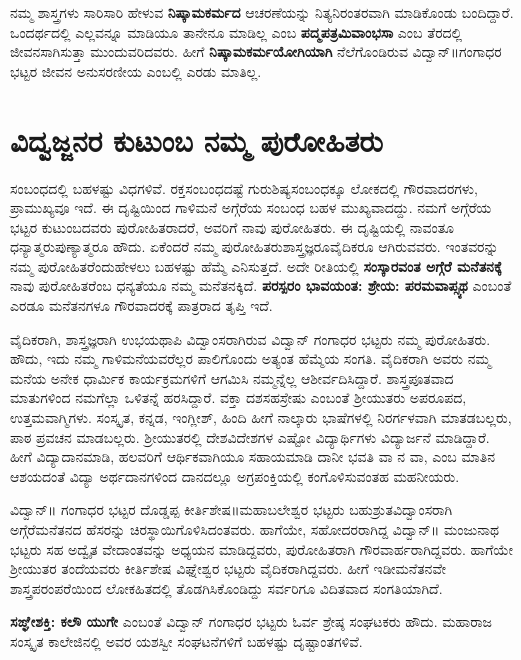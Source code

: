{ನಮ್ಮ ಶಾಸ್ತ್ರಗಳು ಸಾರಿ\enginline{-}ಸಾರಿ ಹೇಳುವ \textbf{ನಿಷ್ಕಾಮಕರ್ಮದ} ಆಚರಣೆಯನ್ನು ನಿತ್ಯ\enginline{-}ನಿರಂತರವಾಗಿ ಮಾಡಿಕೊಂಡು ಬಂದಿದ್ದಾರೆ. ಒಂದರ್ಥದಲ್ಲಿ ಎಲ್ಲವನ್ನೂ ಮಾಡಿಯೂ ತಾನೇನೂ ಮಾಡಿಲ್ಲ ಎಂಬ \textbf{ಪದ್ಮಪತ್ರಮಿವಾಂಭಸಾ} ಎಂಬ ತೆರದಲ್ಲಿ ಜೀವನಸಾಗಿಸುತ್ತಾ ಮುಂದುವರಿದವರು. ಹೀಗೆ \textbf{ನಿಷ್ಕಾಮಕರ್ಮಯೋಗಿಯಾಗಿ} ನೆಲೆಗೊಂಡಿರುವ ವಿದ್ವಾನ್॥ಗಂಗಾಧರ ಭಟ್ಟರ ಜೀವನ ಅನುಸರಣೀಯ ಎಂಬಲ್ಲಿ ಎರಡು ಮಾತಿಲ್ಲ.

\section*{ವಿದ್ವಜ್ಜನರ ಕುಟುಂಬ   \enginline{-}   ನಮ್ಮ ಪುರೋಹಿತರು}

ಸಂಬಂಧದಲ್ಲಿ ಬಹಳಷ್ಟು ವಿಧಗಳಿವೆ. ರಕ್ತಸಂಬಂಧದಷ್ಟೆ ಗುರು\enginline{-}ಶಿಷ್ಯಸಂಬಂಧಕ್ಕೂ ಲೋಕದಲ್ಲಿ ಗೌರವಾದರಗಳು, ಪ್ರಾಮುಖ್ಯವೂ ಇದೆ. ಈ ದೃಷ್ಟಿಯಿಂದ ಗಾಳಿಮನೆ  \enginline{-}  ಅಗ್ಗೆರೆಯ ಸಂಬಂಧ ಬಹಳ ಮುಖ್ಯವಾದದ್ದು.  ನಮಗೆ ಅಗ್ಗೆರೆಯ ಭಟ್ಟರ ಕುಟುಂಬ\-ದವರು ಪುರೋಹಿತರಾದರೆ, ಅವರಿಗೆ ನಾವು ಪುರೋಹಿತರು. ಈ ದೃಷ್ಟಿಯಲ್ಲಿ ನಾವಂತೂ ಧನ್ಯಾತ್ಮರು\enginline{-}ಪುಣ್ಯಾತ್ಮರೂ ಹೌದು. ಏಕೆಂದರೆ ನಮ್ಮ ಪುರೋಹಿತರು\break ಶಾಸ್ತ್ರಜ್ಞರೂ\enginline{-}ವೈದಿಕರೂ ಆಗಿರುವವರು. ಇಂತವರನ್ನು ನಮ್ಮ ಪುರೋಹಿತರೆಂದು\break ಹೇಳಲು ಬಹಳಷ್ಟು ಹೆಮ್ಮೆ ಎನಿಸುತ್ತದೆ. ಅದೇ ರೀತಿಯಲ್ಲಿ \textbf{ಸಂಸ್ಕಾರವಂತ  \enginline{-}   ಅಗ್ಗೆರೆ ಮನೆತನಕ್ಕೆ} ನಾವು ಪುರೋಹಿತರೆಂಬ ಧನ್ಯತೆಯೂ ನಮ್ಮ ಮನೆತನಕ್ಕಿದೆ. \textbf{ಪರಸ್ಪರಂ ಭಾವಯಂತ: ಶ್ರೇಯ: ಪರಮವಾಪ್ಸ್ಯಥ}  ಎಂಬಂತೆ ಎರಡೂ ಮನೆತನಗಳೂ ಗೌರವಾದರಕ್ಕೆ ಪಾತ್ರರಾದ ತೃಪ್ತಿ ಇದೆ. 

ವೈದಿಕರಾಗಿ, ಶಾಸ್ತ್ರಜ್ಞರಾಗಿ ಉಭಯಥಾಪಿ ವಿದ್ವಾಂಸರಾಗಿರುವ ವಿದ್ವಾನ್ ಗಂಗಾಧರ ಭಟ್ಟರು ನಮ್ಮ ಪುರೋಹಿತರು. ಹೌದು, ಇದು ನಮ್ಮ ಗಾಳಿಮನೆಯವರೆಲ್ಲರ ಪಾಲಿಗೊಂದು ಅತ್ಯಂತ ಹೆಮ್ಮೆಯ ಸಂಗತಿ. ವೈದಿಕರಾಗಿ ಅವರು ನಮ್ಮ ಮನೆಯ ಅನೇಕ ಧಾರ್ಮಿಕ ಕಾರ್ಯಕ್ರಮಗಳಿಗೆ ಆಗಮಿಸಿ ನಮ್ಮನ್ನೆಲ್ಲ ಆಶೀರ್ವದಿಸಿದ್ದಾರೆ. ಶಾಸ್ತ್ರಪೂತವಾದ ಮಾತುಗಳಿಂದ ನಮಗೆಲ್ಲಾ ಒಳಿತನ್ನೆ ಹರಸಿದ್ದಾರೆ. ವಕ್ತಾ ದಶಸಹಸ್ರೇಷು ಎಂಬಂತೆ ಶ್ರೀಯುತರು ಅಪರೂಪದ, ಉತ್ತಮವಾಗ್ಮಿಗಳು. ಸಂಸ್ಕೃತ, ಕನ್ನಡ, ಇಂಗ್ಲೀಶ್, ಹಿಂದಿ ಹೀಗೆ ನಾಲ್ಕಾರು ಭಾಷೆಗಳಲ್ಲಿ ನಿರರ್ಗಳವಾಗಿ ಮಾತಡಬಲ್ಲರು, ಪಾಠ \enginline{-}ಪ್ರವಚನ ಮಾಡಬಲ್ಲರು. ಶ್ರೀಯುತರಲ್ಲಿ ದೇಶ\enginline{-}ವಿದೇಶಗಳ ಎಷ್ಟೋ ವಿದ್ಯಾರ್ಥಿಗಳು ವಿದ್ಯಾರ್ಜನೆ ಮಾಡಿದ್ದಾರೆ. ಹೀಗೆ ವಿದ್ಯಾದಾನಮಾಡಿ, ಹಲವರಿಗೆ ಆರ್ಥಿಕವಾಗಿಯೂ ಸಹಾಯಮಾಡಿ ದಾನೀ ಭವತಿ ವಾ ನ ವಾ,  ಎಂಬ ಮಾತಿನ ಆಶಯದಂತೆ ವಿದ್ಯಾ  \enginline{-}  ಅರ್ಥದಾನಗಳಿಂದ ದಾನದಲ್ಲೂ ಅಗ್ರಪಂಕ್ತಿಯಲ್ಲಿ ಕಂಗೊಳಿಸುವಂತಹ ಮಹನೀಯರು. 

ವಿದ್ವಾನ್॥ ಗಂಗಾಧರ ಭಟ್ಟರ ದೊಡ್ಡಪ್ಪ ಕೀರ್ತಿಶೇಷ॥ಮಹಾಬಲೇಶ್ವರ ಭಟ್ಟರು ಬಹುಶ್ರುತವಿದ್ವಾಂಸರಾಗಿ ಅಗ್ಗೆರೆಮನೆತನದ ಹೆಸರನ್ನು ಚಿರಸ್ಥಾಯಿಗೊಳಿಸಿದಂತವರು. ಹಾಗೆಯೇ, ಸಹೋದರರಾಗಿದ್ದ ವಿದ್ವಾನ್॥ ಮಂಜುನಾಥ ಭಟ್ಟರು ಸಹ ಅದ್ವೈತ ವೇದಾಂತವನ್ನು ಅಧ್ಯಯನ ಮಾಡಿದ್ದವರು, ಪುರೋಹಿತರಾಗಿ ಗೌರವಾರ್ಹರಾಗಿ\-ದ್ದವರು. ಹಾಗೆಯೇ ಶ್ರೀಯುತರ ತಂದೆಯವರು ಕೀರ್ತಿಶೇಷ ವಿಘ್ನೇಶ್ವರ ಭಟ್ಟರು ವೈದಿಕ\-ರಾಗಿದ್ದವರು. ಹೀಗೆ ಇಡೀಮನೆತನವೇ ಶಾಸ್ತ್ರಪರಂಪರೆಯಿಂದ ಲೋಕಹಿತದಲ್ಲಿ ತೊಡಗಿಸಿಕೊಂಡಿದ್ದು ಸರ್ವರಿಗೂ ವಿದಿತವಾದ ಸಂಗತಿಯಾಗಿದೆ. 

\textbf{ಸಙ್ಘೇಶಕ್ತಿ: ಕಲೌ ಯುಗೇ} ಎಂಬಂತೆ ವಿದ್ವಾನ್ ಗಂಗಾಧರ ಭಟ್ಟರು ಓರ್ವ ಶ್ರೇಷ್ಠ ಸಂಘಟಕರು ಹೌದು. ಮಹಾರಾಜ ಸಂಸ್ಕೃತ ಕಾಲೇಜಿನಲ್ಲಿ ಅವರ ಯಶಸ್ವೀ ಸಂಘಟನೆಗಳಿಗೆ ಬಹಳಷ್ಟು ದೃಷ್ಟಾಂತಗಳಿವೆ. 

}
